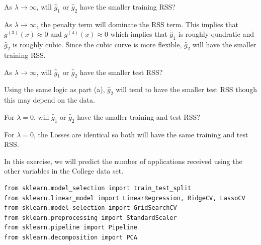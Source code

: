 \documentclass{article}
\begin{document}
\begin{probset}
\begin{prob}
    \begin{subprobset}
        \begin{subprob}
            As $\lambda \to \infty$, will $\hat{g}_1$ or $\hat{g}_2$ have the smaller training RSS?

            \begin{soln}
                As $\lambda \to \infty$, the penalty term will dominate the RSS term. This implies that $g^{(3)}(x) \approx 0$ and $g^{(4)}(x) \approx 0$ which implies that $\hat{g}_1$ is roughly quadratic and $\hat{g}_2$ is roughly cubic. Since the cubic curve is more flexible, $\hat{g}_2$ will have the smaller training RSS.
            \end{soln}
        \end{subprob}

        \begin{subprob}
            As $\lambda \to \infty$, will $\hat{g}_1$ or $\hat{g}_2$ have the smaller test RSS?

            \begin{soln}
                Using the same logic as part (a), $\hat{g}_2$ will tend to have the smaller test RSS though this may depend on the data.
            \end{soln}
        \end{subprob}

        \begin{subprob}
            For $\lambda = 0$, will $\hat{g}_1$ or $\hat{g}_2$ have the smaller training and test RSS?

            \begin{soln}
                For $\lambda = 0$, the Losses are identical so both will have the same training and test RSS.
            \end{soln}
        \end{subprob}
    \end{subprobset}
\end{prob}

\newpage

\begin{prob}
    In this exercise, we will predict the number of applications received using the other variables in the College data set.

    \begin{verbatim}
from sklearn.model_selection import train_test_split
from sklearn.linear_model import LinearRegression, RidgeCV, LassoCV
from sklearn.model_selection import GridSearchCV
from sklearn.preprocessing import StandardScaler
from sklearn.pipeline import Pipeline
from sklearn.decomposition import PCA


\end{verbatim}
\end{prob}
\end{probset}
\end{document}

